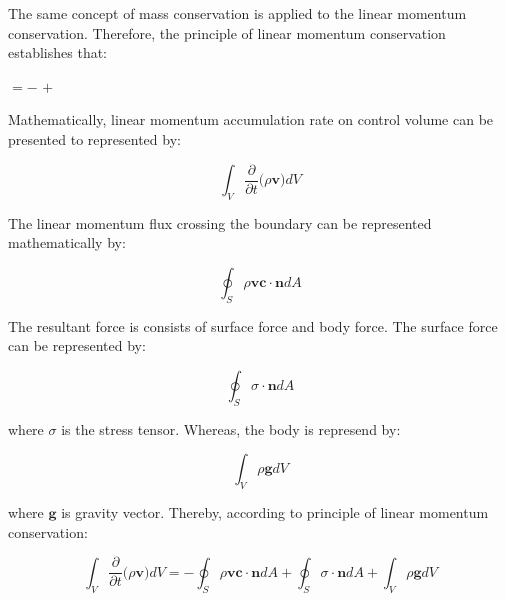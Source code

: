 The same concept of mass conservation is applied to the
linear momentum conservation. Therefore, the principle
of linear momentum conservation establishes that:

\medskip
\begin{center}
           $= -$ 
           $+$ 
\end{center}

\medskip
Mathematically, linear momentum accumulation rate on control volume
can be presented to represented by:

\begin{equation} \label{qml 1} 
 \int_{V} \frac{\partial}{\partial t} \big( \rho \textbf{v} \big) dV
\end{equation}

\medskip
The linear momentum flux crossing the boundary
can be represented mathematically by:

\begin{equation}  
 \oint_{S} \rho \textbf{v} \textbf{c} \cdot \textbf{n} dA
\end{equation}

\medskip
The resultant force is consists of surface force and body force.
The surface force can be represented by:

\begin{equation}  
 \oint_{S} \sigma \cdot \textbf{n} dA
\end{equation}

\medskip
\noindent
where $\sigma$ is the stress tensor. 
Whereas, the body is represend by:

\begin{equation} 
 \int_{V} \rho \textbf{g} dV
\end{equation}

\medskip
\noindent
where $\textbf{g}$ is gravity vector.
Thereby, according to principle of linear momentum conservation:

\begin{equation}
 \int_{V} \frac{\partial}{\partial t} \big( \rho \textbf{v} \big) dV
 = - 
 \oint_{S} \rho \textbf{v} \textbf{c} \cdot \textbf{n} dA
 +
 \oint_{S} \sigma \cdot \textbf{n} dA
 +
 \int_{V} \rho \textbf{g} dV
\end{equation}

